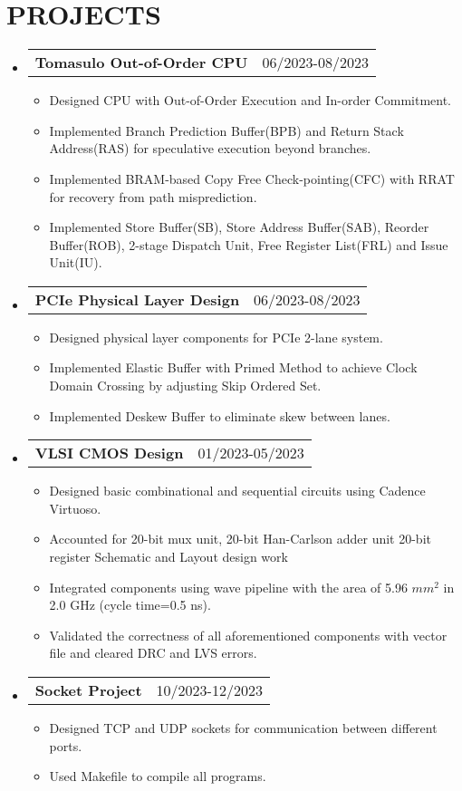 \documentclass[letterpaper,11pt]{article}
\makeatletter
\newcommand{\resumeItemOne}[1]{
  \item\small{#1}
}
\newcommand{\resumeSubheadingNoTitle}[2]{
  \vspace{-1pt}\item
    \begin{tabular*}{0.97\textwidth}[t]{l@{\extracolsep{\fill}}r}
      \textbf{#1} & #2 %
    \end{tabular*}\vspace{-5pt}
}
\newcommand{\resumeSubHeadingListStart}{\begin{itemize}[leftmargin=*]}
\newcommand{\resumeSubHeadingListEnd}{\end{itemize}\vspace{-5pt}}
\newcommand{\resumeItemListStart}{\begin{itemize}}
\newcommand{\resumeItemListEnd}{\end{itemize}\vspace{-10pt}}
\makeatother
\begin{document}
\section{PROJECTS}
\resumeSubHeadingListStart
\resumeSubheadingNoTitle
    {Tomasulo Out-of-Order CPU}{06/2023-08/2023}
\resumeItemListStart
	\resumeItemOne{Designed CPU with Out-of-Order Execution and In-order Commitment.}
	\resumeItemOne{Implemented Branch Prediction Buffer(BPB) and Return Stack Address(RAS) for speculative execution beyond branches.}
	\resumeItemOne{Implemented BRAM-based Copy Free Check-pointing(CFC) with RRAT for recovery from path misprediction.}
	\resumeItemOne{Implemented Store Buffer(SB), Store Address Buffer(SAB), Reorder Buffer(ROB), 2-stage Dispatch Unit, Free Register List(FRL) and Issue Unit(IU).}
\resumeItemListEnd
\resumeSubheadingNoTitle
    {PCIe Physical Layer Design}{06/2023-08/2023}
\resumeItemListStart
	\resumeItemOne{Designed physical layer components for PCIe 2-lane system.}
	\resumeItemOne{Implemented Elastic Buffer with Primed Method to achieve Clock Domain Crossing by adjusting Skip Ordered Set.}
	\resumeItemOne{Implemented Deskew Buffer to eliminate skew between lanes.}
\resumeItemListEnd
\resumeSubheadingNoTitle
    {VLSI CMOS Design}{01/2023-05/2023}
\resumeItemListStart
	\resumeItemOne{Designed basic combinational and sequential circuits using Cadence Virtuoso.}
	\resumeItemOne{Accounted for 20-bit mux unit, 20-bit Han-Carlson adder unit 20-bit register Schematic and Layout design work}
	\resumeItemOne{Integrated components using wave pipeline with the area of 5.96 $mm^2$ in 2.0 GHz (cycle time=0.5 ns).}
	\resumeItemOne{Validated the correctness of all aforementioned components with vector file and cleared DRC and LVS errors.}
\resumeItemListEnd
\resumeSubheadingNoTitle
    {Socket Project}{10/2023-12/2023}
\resumeItemListStart
	\resumeItemOne{Designed TCP and UDP sockets for communication between different ports.}
	\resumeItemOne{Used Makefile to compile all programs.}
\resumeItemListEnd
\resumeSubHeadingListEnd
\end{document}
